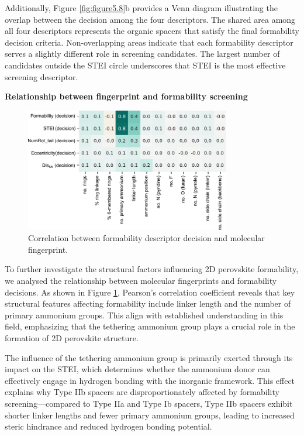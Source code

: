 Additionally, Figure \ref{fig:figure5.8}b provides a Venn diagram illustrating the overlap between the decision among the four descriptors. The shared area among all four descriptors represents the organic spacers that satisfy the final formability decision criteria. Non-overlapping areas indicate that each formability descriptor serves a slightly different role in screening candidates. The largest number of candidates outside the STEI circle underscores that STEI is the most effective screening descriptor.


\textbf{Relationship between fingerprint and formability screening}

\begin{figure}[htbp]
    \centering
    \includegraphics[width=0.8\textwidth]{figures/synthesis-feasibility/figure5-9.pdf}
    \caption{Correlation between formability descriptor decision and molecular fingerprint.}
    \label{fig:figure5.9}
\end{figure}

To further investigate the structural factors influencing 2D perovskite formability, we analysed the relationship between molecular fingerprints and formability decisions. As shown in Figure \ref{fig:figure5.9}, Pearson’s correlation coefficient reveals that key structural features affecting formability include linker length and the number of primary ammonium groups. This align with established understanding in this field\cite{RN144}, emphasizing that the tethering ammonium group plays a crucial role in the formation of 2D perovskite structure. 

The influence of the tethering ammonium group is primarily exerted through its impact on the STEI, which determines whether the ammonium donor can effectively engage in hydrogen bonding with the inorganic framework. This effect explains why Type IIb spacers are disproportionately affected by formability screening—compared to Type IIa and Type Ib spacers, Type IIb spacers exhibit shorter linker lengths and fewer primary ammonium groups, leading to increased steric hindrance and reduced hydrogen bonding potential.




